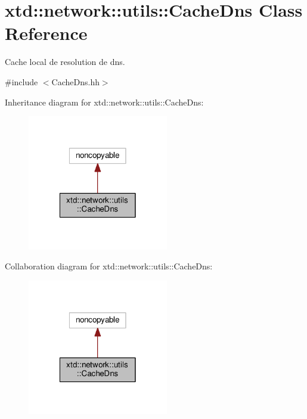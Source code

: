 \hypertarget{classxtd_1_1network_1_1utils_1_1CacheDns}{\section{xtd\-:\-:network\-:\-:utils\-:\-:Cache\-Dns Class Reference}
\label{classxtd_1_1network_1_1utils_1_1CacheDns}
}


Cache local de resolution de dns.  




{\ttfamily \#include $<$Cache\-Dns.\-hh$>$}



Inheritance diagram for xtd\-:\-:network\-:\-:utils\-:\-:Cache\-Dns\-:
\nopagebreak
\begin{figure}[H]
\begin{center}
\leavevmode
\includegraphics[width=174pt]{classxtd_1_1network_1_1utils_1_1CacheDns__inherit__graph}
\end{center}
\end{figure}


Collaboration diagram for xtd\-:\-:network\-:\-:utils\-:\-:Cache\-Dns\-:
\nopagebreak
\begin{figure}[H]
\begin{center}
\leavevmode
\includegraphics[width=174pt]{classxtd_1_1network_1_1utils_1_1CacheDns__coll__graph}
\end{center}
\end{figure}
